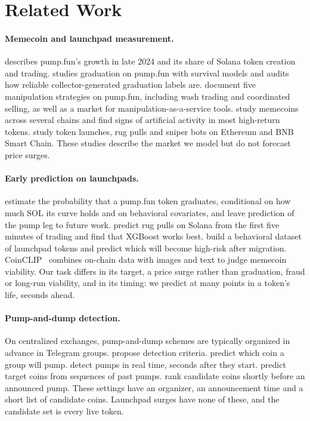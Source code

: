 \section{Related Work}
\label{sec:related}

\paragraph{Memecoin and launchpad measurement.}
\citet{mancino2025memecoin} describes pump.fun's growth in late 2024 and its share of Solana token creation and trading. \citet{kamat2026auditing} studies graduation on pump.fun with survival models and audits how reliable collector-generated graduation labels are. \citet{szwajcok2026factories} document five manipulation strategies on pump.fun, including wash trading and coordinated selling, as well as a market for manipulation-as-a-service tools. \citet{mongardini2025midsummer} study memecoins across several chains and find signs of artificial activity in most high-return tokens. \citet{cernera2023token} study token launches, rug pulls and sniper bots on Ethereum and BNB Smart Chain. These studies describe the market we model but do not forecast price surges.

\paragraph{Early prediction on launchpads.}
\citet{marino2026predicting} estimate the probability that a pump.fun token graduates, conditional on how much SOL its curve holds and on behavioral covariates, and leave prediction of the pump leg to future work. \citet{li2026catching} predict rug pulls on Solana from the first five minutes of trading and find that XGBoost works best. \citet{hu2026melt} build a behavioral dataset of launchpad tokens and predict which will become high-risk after migration. CoinCLIP~\citep{long2024coinclip} combines on-chain data with images and text to judge memecoin viability. Our task differs in its target, a price surge rather than graduation, fraud or long-run viability, and in its timing: we predict at many points in a token's life, seconds ahead.

\paragraph{Pump-and-dump detection.}
On centralized exchanges, pump-and-dump schemes are typically organized in advance in Telegram groups. \citet{kamps2018moon} propose detection criteria. \citet{xu2019anatomy} predict which coin a group will pump. \citet{lamorgia2020pump,lamorgia2023doge} detect pumps in real time, seconds after they start. \citet{hu2023sequence} predict target coins from sequences of past pumps. \citet{bolz2024realtime} rank candidate coins shortly before an announced pump. These settings have an organizer, an announcement time and a short list of candidate coins. Launchpad surges have none of these, and the candidate set is every live token.

